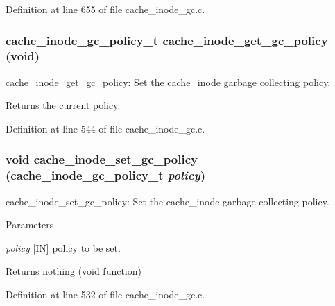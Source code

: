 Definition at line 655 of file cache\_\-inode\_\-gc.c.
\subsubsection[{cache\_\-inode\_\-get\_\-gc\_\-policy}]{\setlength{\rightskip}{0pt plus 5cm}cache\_\-inode\_\-gc\_\-policy\_\-t cache\_\-inode\_\-get\_\-gc\_\-policy (void)}\label{group__Cache__inode__gc__interface_gab355d80bfbbb711ce94b45b7a3cc7df9}
cache\_\-inode\_\-get\_\-gc\_\-policy: Set the cache\_\-inode garbage collecting policy.

\begin{DoxyReturn}{Returns}
the current policy. 
\end{DoxyReturn}


Definition at line 544 of file cache\_\-inode\_\-gc.c.
\subsubsection[{cache\_\-inode\_\-set\_\-gc\_\-policy}]{\setlength{\rightskip}{0pt plus 5cm}void cache\_\-inode\_\-set\_\-gc\_\-policy (cache\_\-inode\_\-gc\_\-policy\_\-t {\em policy})}\label{group__Cache__inode__gc__interface_ga69c5ffce5cdb7882aa52f72c665a2790}
cache\_\-inode\_\-set\_\-gc\_\-policy: Set the cache\_\-inode garbage collecting policy.


\begin{DoxyParams}{Parameters}
\item[{\em policy}][IN] policy to be set.\end{DoxyParams}
\begin{DoxyReturn}{Returns}
nothing (void function) 
\end{DoxyReturn}


Definition at line 532 of file cache\_\-inode\_\-gc.c.